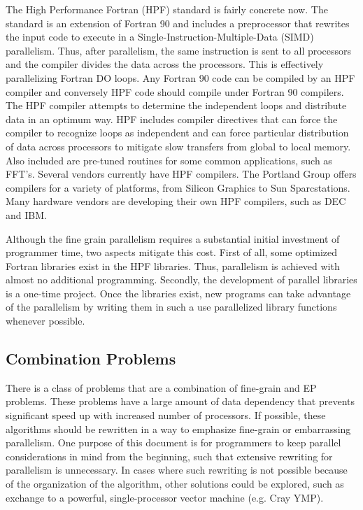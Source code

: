 The High Performance Fortran (HPF) standard is fairly concrete now.
The standard is an extension of Fortran 90 and includes a preprocessor
that rewrites the input code to execute in a
Single-Instruction-Multiple-Data (SIMD) parallelism.  Thus, after
parallelism, the same instruction is sent to all processors and the
compiler divides the data across the processors.  This is effectively
parallelizing Fortran DO loops.  Any Fortran 90 code can be compiled
by an HPF compiler and conversely HPF code should compile under
Fortran 90 compilers. The HPF compiler attempts to determine the
independent loops and distribute data in an optimum way.  HPF includes
compiler directives that can force the compiler to recognize loops as
independent and can force particular distribution of data across
processors to mitigate slow transfers from global to local memory.
Also included are pre-tuned routines for some common applications,
such as FFT's.  Several vendors currently have HPF compilers.  The
Portland Group offers compilers for a variety of platforms, from
Silicon Graphics to Sun Sparcstations.  Many hardware vendors are
developing their own HPF compilers, such as DEC and IBM.

Although the fine grain parallelism requires a substantial initial
investment of programmer time, two aspects mitigate this cost.  First
of all, some optimized Fortran libraries exist in the HPF libraries.
Thus, parallelism is achieved with almost no additional programming.
Secondly, the development of parallel libraries is a one-time
project.  Once the libraries exist, new programs can take advantage of
the parallelism by writing them in such a use parallelized library
functions whenever possible.

\subsection{Combination Problems}

There is a class of problems that are a combination of fine-grain and
EP problems.  These problems have a large amount of data dependency
that prevents significant speed up with increased number of
processors.  If possible, these algorithms should be rewritten in a
way to emphasize fine-grain or embarrassing parallelism.  One purpose
of this document is for programmers to keep parallel considerations in
mind from the beginning, such that extensive rewriting for parallelism
is unnecessary.  In cases where such rewriting is not possible because
of the organization of the algorithm, other solutions could be
explored, such as exchange to a powerful, single-processor vector
machine (e.g. Cray YMP).

